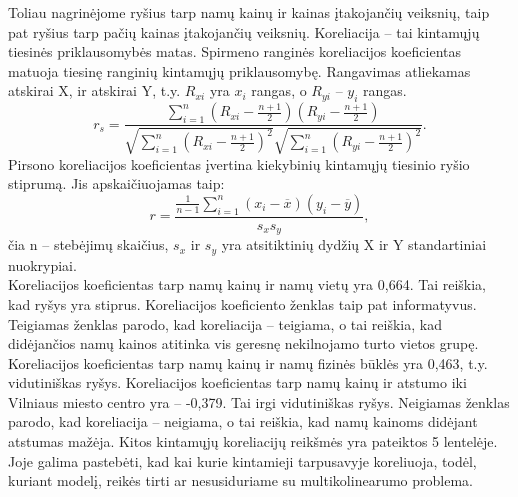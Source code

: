 \documentclass[a4paper]{article}
\begin{document}
\hspace*{0,01cm}Toliau nagrinėjome ryšius tarp namų kainų ir kainas įtakojančių veiksnių, taip pat ryšius tarp pačių kainas įtakojančių veiksnių. Koreliacija -- tai kintamųjų tiesinės priklausomybės matas. Spirmeno ranginės koreliacijos koeficientas matuoja tiesinę ranginių kintamųjų priklausomybę. Rangavimas atliekamas atskirai X, ir atskirai Y, t.y. $R_{xi}$ yra $x_i$ rangas, o $R_{yi}$ -- $y_i$ rangas.
\begin{equation}
r_s=\frac{\sum_{i=1}^{n}(R_{xi}-\frac{n+1}{2})(R_{yi}-\frac{n+1}{2})}{\sqrt{\sum_{i=1}^{n}(R_{xi}-\frac{n+1}{2})^2}\sqrt{\sum_{i=1}^{n}(R_{yi}-\frac{n+1}{2})^2}}.
\end{equation}
Pirsono koreliacijos koeficientas įvertina kiekybinių kintamųjų tiesinio ryšio stiprumą. Jis apskaičiuojamas taip:
\begin{equation}
r=\frac{\frac{1}{n-1}\sum_{i=1}^{n}(x_i-\overline{x})(y_i-\overline{y})}{s_x s_y},
\end{equation}
čia n -- stebėjimų skaičius, $s_x$ ir $s_y$ yra atsitiktinių dydžių X ir Y standartiniai nuokrypiai.\\
\hspace*{0,52cm}Koreliacijos koeficientas tarp namų kainų ir namų vietų yra 0,664. Tai reiškia, kad ryšys yra stiprus. Koreliacijos koeficiento ženklas taip pat informatyvus. Teigiamas ženklas parodo, kad koreliacija -- teigiama, o tai reiškia, kad didėjančios namų kainos atitinka vis geresnę nekilnojamo turto vietos grupę. Koreliacijos koeficientas tarp namų kainų ir namų fizinės būklės yra 0,463, t.y. vidutiniškas ryšys. Koreliacijos koeficientas tarp namų kainų ir atstumo iki Vilniaus miesto centro yra -- -0,379. Tai irgi vidutiniškas ryšys. Neigiamas ženklas parodo, kad koreliacija -- neigiama, o tai reiškia, kad namų kainoms didėjant atstumas mažėja. Kitos kintamųjų koreliacijų reikšmės yra pateiktos 5 lentelėje. Joje galima pastebėti, kad kai kurie kintamieji tarpusavyje koreliuoja, todėl, kuriant modelį, reikės tirti ar nesusiduriame su multikolinearumo problema.\\
\end{document}
